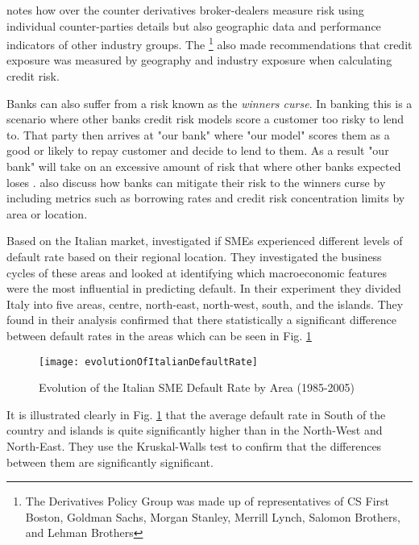 \cite{fama_term_1986} notes how over the counter derivatives broker-dealers measure risk using individual counter-parties details but also geographic data and performance indicators of other industry groups. The \cite{derivatives_policy_group_framework_1995} \footnote{The Derivatives Policy Group was made up of representatives of CS First Boston, Goldman Sachs, Morgan Stanley, Merrill Lynch, Salomon Brothers, and Lehman Brothers} also made recommendations that credit exposure was measured by geography and industry exposure when calculating credit risk.

Banks can also suffer from a risk known as the \textit{winners curse}. In banking this is a scenario where other banks credit risk models score a customer too risky to lend to. That party then arrives at "our bank" where "our model" scores them as a good or likely to repay customer and decide to lend to them. As a result "our bank" will take on an excessive amount of risk that where other banks expected loses \citep{duffie_credit_2012}. \cite{duffie_credit_2012} also discuss how banks can mitigate their risk to the winners curse by including metrics such as borrowing rates and credit risk concentration limits by area or location.

Based on the Italian market, \citep{di_pietro_regional} investigated if SMEs experienced different levels of default rate based on their regional location. They investigated the business cycles of these areas and looked at identifying which macroeconomic features were the most influential in predicting default. In their experiment they divided Italy into five areas, centre, north-east, north-west, south, and the islands. They found in their analysis confirmed that there statistically a significant difference between default rates in the areas which can be seen in Fig. \ref{fig:evolutionOfItalianDefaultRate}

\begin{figure}[H]
	\texttt{[image: evolutionOfItalianDefaultRate]}
	\caption{Evolution of the Italian SME Default Rate by Area (1985-2005) \\
	\cite[Source:][]{di_pietro_regional}		
			}
	\label{fig:evolutionOfItalianDefaultRate}
\end{figure}

It is  illustrated clearly in Fig. \ref{fig:evolutionOfItalianDefaultRate} that the average default rate in South of the country and islands is quite significantly higher than in the North-West and North-East. They use the Kruskal-Walls test to confirm that the differences between them are significantly significant.

